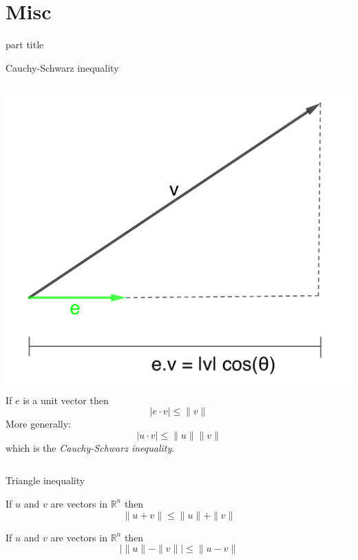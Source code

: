 \documentclass{beamer}
\begin{document}
\section{Misc}

\begin{frame}
\begin{beamercolorbox}[sep=12pt,center]{part title}
\insertsection\par
\end{beamercolorbox}
\end{frame}

\begin{frame}{Cauchy-Schwarz inequality}
\begin{columns}
    \hspace{-1cm}
    \includegraphics[scale=1.7]{projection-onto-unit.png}
    If $e$ is a unit vector then
    \begin{equation*}
    |e\cdot v| \leq \|v\|
    \end{equation*}
    More generally:
    \begin{equation*}
        |u\cdot v| \leq \|u\|\|v\|
    \end{equation*}
    which is the \emph{Cauchy-Schwarz inequality}.
\end{columns}
\end{frame}

\begin{frame}{Triangle inequality}
\begin{theorem}
  If $u$ and $v$ are vectors in $\mathbb{R}^n$ then
  \begin{equation*}
    \|u+v\| \leq \|u\|+\|v\|
  \end{equation*}
\end{theorem}\vfill
\begin{theorem}
  If $u$ and $v$ are vectors in $\mathbb{R}^n$ then
  \begin{equation*}
    |\|u\|-\|v\||\leq \|u-v\|
  \end{equation*}
\end{theorem}
\end{frame}
\end{document}
